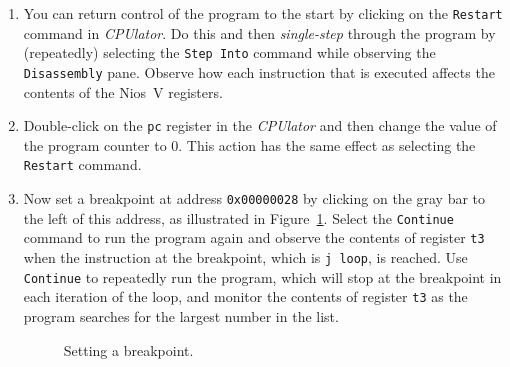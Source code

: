 \documentclass[epsfig,10pt,fullpage]{article}
\begin{document}
\begin{enumerate}
\item You can return control of the program to the start by clicking on the \texttt{Restart}
command in {\it CPUlator}.
Do this and then {\it single-step} through the program by (repeatedly) selecting the
\texttt{Step Into} command while observing the \texttt{Disassembly} pane.  
Observe how each instruction that is executed affects 
the contents of the Nios~V registers.

\item Double-click on the \texttt{pc} register in the {\it CPUlator} and then change the
value of the program counter to 0.  This action has the same effect as
selecting the \texttt{Restart} command. 

\item Now set a breakpoint at address \texttt{0x00000028} by clicking on the gray bar to
the left of this address, as illustrated in Figure~\ref{fig:bp}. Select the \texttt{Continue}
command to run the program again and observe the contents of register \texttt{t3} when 
the instruction at the breakpoint, which is \texttt{j loop}, is reached. Use 
\texttt{Continue} to repeatedly run the program, which will stop at the breakpoint in each
iteration of the loop, and monitor 
the contents of register \texttt{t3} as the program searches for 
the largest number in the list.

\begin{figure}[H]
	\begin{center}
    \setlength{\fboxsep}{0pt}
	\end{center}
	\caption{Setting a breakpoint.}
\label{fig:bp}
\end{figure} 

\end{enumerate}
\end{document}
